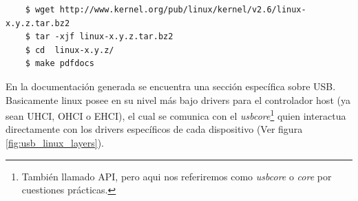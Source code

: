\begin{scriptsize}
	\begin{verbatim}
	$ wget http://www.kernel.org/pub/linux/kernel/v2.6/linux-x.y.z.tar.bz2
	$ tar -xjf linux-x.y.z.tar.bz2
	$ cd  linux-x.y.z/
	$ make pdfdocs
	\end{verbatim}
\end{scriptsize}

En la documentaci\'on generada se encuentra una secci\'on espec\'ifica sobre
USB.\\

Basicamente linux posee en su nivel m\'as bajo drivers para el controlador
host (ya sean UHCI, OHCI o EHCI), el cual se comunica con el
\emph{usbcore}\footnote{Tambi\'en llamado API, pero aqui nos referiremos como
\emph{usbcore} o \emph{core} por cuestiones pr\'acticas.} quien interactua
directamente con los drivers espec\'ificos de cada dispositivo (Ver figura
\ref{fig:usb_linux_layers}).


